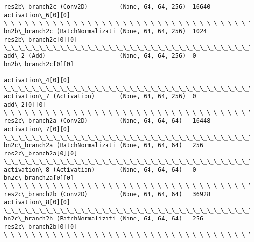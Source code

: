 \documentclass[11pt]{article}
\begin{document}
\begin{Verbatim}[commandchars=\\\{\}]
res2b\_branch2c (Conv2D)         (None, 64, 64, 256)  16640       activation\_6[0][0]               
\_\_\_\_\_\_\_\_\_\_\_\_\_\_\_\_\_\_\_\_\_\_\_\_\_\_\_\_\_\_\_\_\_\_\_\_\_\_\_\_\_\_\_\_\_\_\_\_\_\_\_\_\_\_\_\_\_\_\_\_\_\_\_\_\_\_\_\_\_\_\_\_\_\_\_\_\_\_\_\_\_\_\_\_\_\_\_\_\_\_\_\_\_\_\_\_\_\_
bn2b\_branch2c (BatchNormalizati (None, 64, 64, 256)  1024        res2b\_branch2c[0][0]             
\_\_\_\_\_\_\_\_\_\_\_\_\_\_\_\_\_\_\_\_\_\_\_\_\_\_\_\_\_\_\_\_\_\_\_\_\_\_\_\_\_\_\_\_\_\_\_\_\_\_\_\_\_\_\_\_\_\_\_\_\_\_\_\_\_\_\_\_\_\_\_\_\_\_\_\_\_\_\_\_\_\_\_\_\_\_\_\_\_\_\_\_\_\_\_\_\_\_
add\_2 (Add)                     (None, 64, 64, 256)  0           bn2b\_branch2c[0][0]              
                                                                 activation\_4[0][0]               
\_\_\_\_\_\_\_\_\_\_\_\_\_\_\_\_\_\_\_\_\_\_\_\_\_\_\_\_\_\_\_\_\_\_\_\_\_\_\_\_\_\_\_\_\_\_\_\_\_\_\_\_\_\_\_\_\_\_\_\_\_\_\_\_\_\_\_\_\_\_\_\_\_\_\_\_\_\_\_\_\_\_\_\_\_\_\_\_\_\_\_\_\_\_\_\_\_\_
activation\_7 (Activation)       (None, 64, 64, 256)  0           add\_2[0][0]                      
\_\_\_\_\_\_\_\_\_\_\_\_\_\_\_\_\_\_\_\_\_\_\_\_\_\_\_\_\_\_\_\_\_\_\_\_\_\_\_\_\_\_\_\_\_\_\_\_\_\_\_\_\_\_\_\_\_\_\_\_\_\_\_\_\_\_\_\_\_\_\_\_\_\_\_\_\_\_\_\_\_\_\_\_\_\_\_\_\_\_\_\_\_\_\_\_\_\_
res2c\_branch2a (Conv2D)         (None, 64, 64, 64)   16448       activation\_7[0][0]               
\_\_\_\_\_\_\_\_\_\_\_\_\_\_\_\_\_\_\_\_\_\_\_\_\_\_\_\_\_\_\_\_\_\_\_\_\_\_\_\_\_\_\_\_\_\_\_\_\_\_\_\_\_\_\_\_\_\_\_\_\_\_\_\_\_\_\_\_\_\_\_\_\_\_\_\_\_\_\_\_\_\_\_\_\_\_\_\_\_\_\_\_\_\_\_\_\_\_
bn2c\_branch2a (BatchNormalizati (None, 64, 64, 64)   256         res2c\_branch2a[0][0]             
\_\_\_\_\_\_\_\_\_\_\_\_\_\_\_\_\_\_\_\_\_\_\_\_\_\_\_\_\_\_\_\_\_\_\_\_\_\_\_\_\_\_\_\_\_\_\_\_\_\_\_\_\_\_\_\_\_\_\_\_\_\_\_\_\_\_\_\_\_\_\_\_\_\_\_\_\_\_\_\_\_\_\_\_\_\_\_\_\_\_\_\_\_\_\_\_\_\_
activation\_8 (Activation)       (None, 64, 64, 64)   0           bn2c\_branch2a[0][0]              
\_\_\_\_\_\_\_\_\_\_\_\_\_\_\_\_\_\_\_\_\_\_\_\_\_\_\_\_\_\_\_\_\_\_\_\_\_\_\_\_\_\_\_\_\_\_\_\_\_\_\_\_\_\_\_\_\_\_\_\_\_\_\_\_\_\_\_\_\_\_\_\_\_\_\_\_\_\_\_\_\_\_\_\_\_\_\_\_\_\_\_\_\_\_\_\_\_\_
res2c\_branch2b (Conv2D)         (None, 64, 64, 64)   36928       activation\_8[0][0]               
\_\_\_\_\_\_\_\_\_\_\_\_\_\_\_\_\_\_\_\_\_\_\_\_\_\_\_\_\_\_\_\_\_\_\_\_\_\_\_\_\_\_\_\_\_\_\_\_\_\_\_\_\_\_\_\_\_\_\_\_\_\_\_\_\_\_\_\_\_\_\_\_\_\_\_\_\_\_\_\_\_\_\_\_\_\_\_\_\_\_\_\_\_\_\_\_\_\_
bn2c\_branch2b (BatchNormalizati (None, 64, 64, 64)   256         res2c\_branch2b[0][0]             
\_\_\_\_\_\_\_\_\_\_\_\_\_\_\_\_\_\_\_\_\_\_\_\_\_\_\_\_\_\_\_\_\_\_\_\_\_\_\_\_\_\_\_\_\_\_\_\_\_\_\_\_\_\_\_\_\_\_\_\_\_\_\_\_\_\_\_\_\_\_\_\_\_\_\_\_\_\_\_\_\_\_\_\_\_\_\_\_\_\_\_\_\_\_\_\_\_\_

\end{Verbatim}
\end{document}
